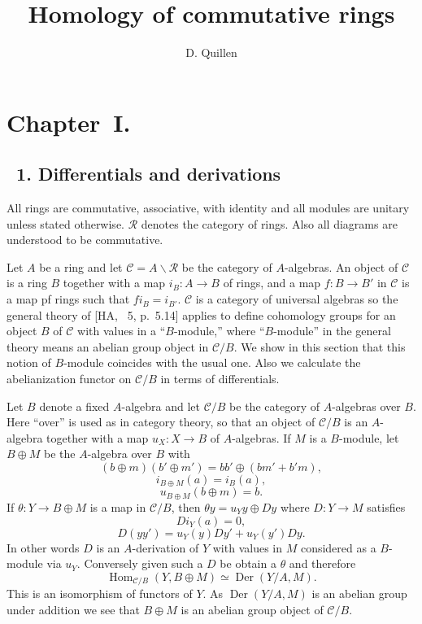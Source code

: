 \documentclass[10pt,reqno]{amsart}
\title{Homology of commutative rings}
\author{D. Quillen}
\DeclareMathOperator{\Hom}{Hom}
\DeclareMathOperator{\Der}{Der}
\newcommand{\cat}{\mathcal}
\newcommand{\C}{\cat{C}}
\newcommand{\R}{\cat{R}}
\begin{document}
\maketitle

\section*{Chapter~I.}
\subsection*{\textsection~1. Differentials and derivations}

All rings are commutative, associative, with identity and all modules are unitary unless
stated otherwise. $\R$ denotes the category of rings. Also all diagrams are understood
to be commutative.

Let $A$ be a ring and let $\C=A\backslash\R$ be the category of $A$-algebras.
An object of $\C$ is a ring $B$ together with a map $i_B:A\to B$ of rings,
and a map $f:B\to B'$ in $\C$ is a map pf rings such that $fi_B=i_{B'}$. $\C$
is a category of universal algebras so the general theory of [HA, \textsection~5, p.~5.14]
applies to define cohomology groups for an object $B$
of $\C$ with values in a ``$B$-module,'' where ``$B$-module'' in the general theory
means an abelian group object in $\C/B$. We show in this section that this notion of
$B$-module coincides with the usual one. Also we calculate the abelianization functor
on $\C/B$ in terms of differentials.

Let $B$ denote a fixed $A$-algebra and let $\C/B$ be the category of $A$-algebras
over $B$. Here ``over'' is used as in category theory, so that an object of $\C/B$
is an $A$-algebra together with a map $u_X:X\to B$ of $A$-algebras. If $M$ is a
$B$-module, let $B\oplus M$ be the $A$-algebra over $B$ with
\[
  (b\oplus m)(b'\oplus m')=bb'\oplus(bm'+b'm),
\]
\[
  i_{B\oplus M}(a)=i_B(a),
\]
\[
  u_{B\oplus M}(b\oplus m)=b.
\]
If $\theta:Y\to B\oplus M$ is a map in $\C/B$, then $\theta y=u_Y y\oplus Dy$ where
$D:Y\to M$ satisfies
\[
  Di_Y(a)=0,
\]
\[
  D(yy')=u_Y(y)Dy'+u_Y(y')Dy.
\]
In other words $D$ is an $A$-derivation of $Y$ with values in $M$ considered as a
$B$-module via $u_Y$. Conversely given such a $D$ be obtain a $\theta$ and therefore
\[
  \Hom_{\C/B}(Y,B\oplus M)\simeq\Der(Y/A,M).\tag{1.1}
\]
This is an isomorphism of functors of $Y$. As $\Der(Y/A,M)$ is an abelian group under
addition we see that $B\oplus M$ is an abelian group object of $\C/B$.
\end{document}
